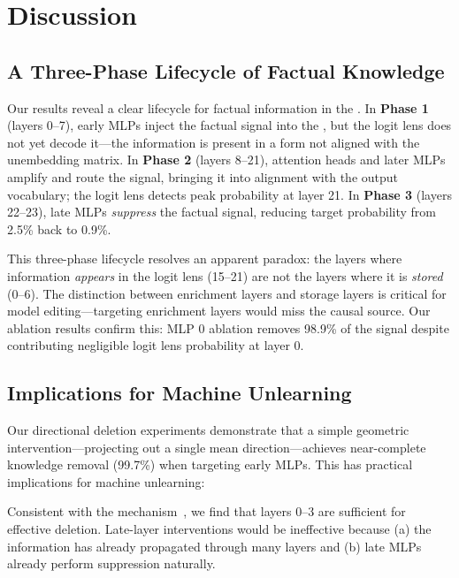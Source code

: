 \section{Discussion}
\label{sec:discussion}

\subsection{A Three-Phase Lifecycle of Factual Knowledge}
\label{sec:lifecycle}

Our results reveal a clear lifecycle for factual information in the \residstream. In \textbf{Phase 1} (layers 0--7), early MLPs inject the factual signal into the \residstream, but the logit lens does not yet decode it---the information is present in a form not aligned with the unembedding matrix. In \textbf{Phase 2} (layers 8--21), attention heads and later MLPs amplify and route the signal, bringing it into alignment with the output vocabulary; the logit lens detects peak probability at layer 21. In \textbf{Phase 3} (layers 22--23), late MLPs \emph{suppress} the factual signal, reducing target probability from 2.5\% back to 0.9\%.

This three-phase lifecycle resolves an apparent paradox: the layers where information \emph{appears} in the logit lens (15--21) are not the layers where it is \emph{stored} (0--6). The distinction between enrichment layers and storage layers is critical for model editing---targeting enrichment layers would miss the causal source. Our ablation results confirm this: MLP 0 ablation removes 98.9\% of the signal despite contributing negligible logit lens probability at layer 0.

\subsection{Implications for Machine Unlearning}
\label{sec:unlearning}

Our directional deletion experiments demonstrate that a simple geometric intervention---projecting out a single mean direction---achieves near-complete knowledge removal (99.7\%) when targeting early MLPs. This has practical implications for machine unlearning:

 Consistent with the \flu mechanism~\citep{ghosh2024mechanistic}, we find that layers 0--3 are sufficient for effective deletion. Late-layer interventions would be ineffective because (a) the information has already propagated through many layers and (b) late MLPs already perform suppression naturally.

